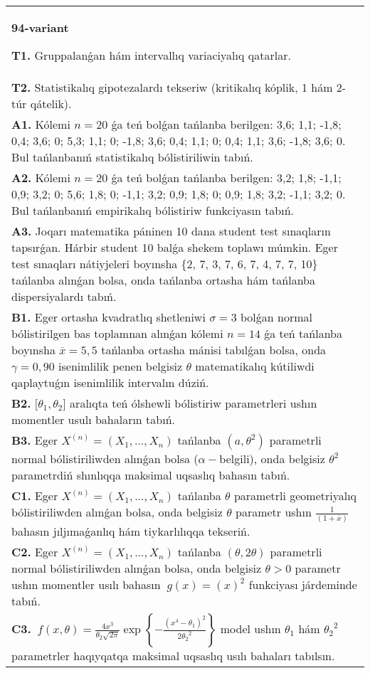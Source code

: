 \documentclass{article}
\begin{document}
\vspace{1cm}


\begin{tabular}{m{17cm}}
\textbf{94-variant}
\newline

\textbf{T1.} 
Gruppalanǵan hám intervallıq variaciyalıq qatarlar.
 \\
\textbf{T2.} 
Statistikalıq gipotezalardı tekseriw (kritikalıq kóplik, 1 hám 2-túr qátelik).
 \\
\textbf{A1.} 
Kólemi \(n = 20\) ǵa teń bolǵan tańlanba berilgen: 3,6; 1,1; -1,8; 0,4; 3,6; 0; 5,3; 1,1; 0; -1,8; 3,6; 0,4; 1,1; 0; 0,4; 1,1; 3,6; -1,8; 3,6; 0. Bul tańlanbanıń statistikalıq bólistiriliwin tabıń.
 \\
\textbf{A2.} 
Kólemi \(n = 20\) ǵa teń bolǵan tańlanba berilgen: 3,2; 1,8; -1,1; 0,9; 3,2; 0; 5,6; 1,8; 0; -1,1; 3,2; 0,9; 1,8; 0; 0,9; 1,8; 3,2; -1,1; 3,2; 0. Bul tańlanbanıń empirikalıq bólistiriw funkciyasın tabıń.
 \\
\textbf{A3.} 
Joqarı matematika páninen 10 dana student test sınaqların tapsırǵan. Hárbir student 10 balǵa shekem toplawı múmkin. Eger test sınaqları nátiyjeleri boyınsha \{2, 7, 3, 7, 6, 7, 4, 7, 7, 10\} tańlanba alınǵan bolsa, onda tańlanba ortasha hám tańlanba dispersiyalardı tabıń.
 \\
\textbf{B1.} 
Eger ortasha kvadratlıq shetleniwi \(\sigma = 3\) bolǵan normal bólistirilgen bas toplamnan alınǵan kólemi \(n = 14\) ǵa teń tańlanba boyınsha \(\overline{x} = 5,5\) tańlanba ortasha mánisi tabılǵan bolsa, onda \(\gamma = 0,90\) isenimlilik penen belgisiz \(\theta\) matematikalıq kútiliwdi qaplaytuǵın isenimlilik intervalın dúziń.
 \\
\textbf{B2.} 
\(\lbrack\theta_{1},\theta_{2}\rbrack\) aralıqta teń ólshewli bólistiriw parametrleri ushın momentler usulı bahaların tabıń.
 \\
\textbf{B3.} 
Eger \(X^{(n)} = \left( X_{1},...,X_{n} \right)\) tańlanba \(\left( a,\theta^{2} \right)\) parametrli normal bólistiriliwden alınǵan bolsa (\(\alpha -\)belgili), onda belgisiz \(\theta^{2}\) parametrdiń shınlıqqa maksimal uqsaslıq bahasın tabıń.
 \\
\textbf{C1.} 
Eger \(X^{(n)} = \left( X_{1},...,X_{n} \right)\) tańlanba \(\theta\) parametrli geometriyalıq bólistiriliwden alınǵan bolsa, onda belgisiz \(\theta\) parametr ushın \(\frac{1}{(1 + \overline{x})}\) bahasın jıljımaǵanlıq hám tiykarlılıqqa tekseriń.
 \\
\textbf{C2.} 
Eger \(X^{(n)} = \left( X_{1},...,X_{n} \right)\) tańlanba \((\theta,2\theta)\) parametrli normal bólistiriliwden alınǵan bolsa, onda belgisiz \(\theta > 0\) parametr ushın momentler usılı bahasın \({\ g(x) = (x)}^{2}\) funkciyası járdeminde tabıń.
 \\
\textbf{C3.} 
\(\ f(x,\theta) = \frac{4x^{3}}{\theta_{2}\sqrt{2\pi}}\exp\left\{ - \frac{\left( x^{4} - \theta_{1} \right)^{2}}{2{\theta_{2}}^{2}} \right\}\) model ushın \(\theta_{1}\) hám \({\theta_{2}}^{2}\) parametrler haqıyqatqa maksimal uqsaslıq usılı bahaları tabılsın.
 \\

\end{tabular}
\vspace{1cm}
\end{document}
